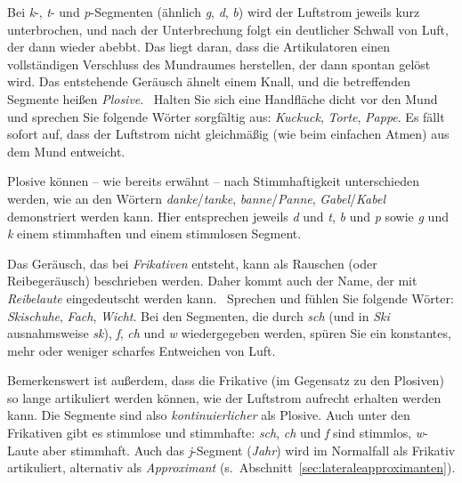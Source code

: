 Bei \textit{k}-, \textit{t}- und \textit{p}-Segmenten (ähnlich \textit{g}, \textit{d}, \textit{b}) wird der Luftstrom jeweils kurz unterbrochen, und nach der Unterbrechung folgt ein deutlicher Schwall von Luft, der dann wieder abebbt.
Das liegt daran, dass die Artikulatoren einen vollständigen Verschluss des Mundraumes herstellen, der dann spontan gelöst wird.
Das entstehende Geräusch ähnelt einem Knall, und die betreffenden Segmente heißen \textit{Plosive}.
\TuBegin~Halten Sie sich eine Handfläche dicht vor den Mund und sprechen Sie folgende Wörter sorgfältig aus: \textit{Kuckuck}, \textit{Torte}, \textit{Pappe}.
Es fällt sofort auf, dass der Luftstrom nicht gleichmäßig (wie beim einfachen Atmen) aus dem Mund entweicht.


Plosive können -- wie bereits erwähnt -- nach Stimmhaftigkeit unterschieden werden, wie an den Wörtern \textit{danke}/\textit{tanke}, \textit{banne}/\textit{Panne}, \textit{Gabel}/\textit{Kabel} demonstriert werden kann.
Hier entsprechen jeweils \textit{d} und \textit{t}, \textit{b} und \textit{p} sowie \textit{g} und \textit{k} einem stimmhaften und einem stimmlosen Segment.

Das Geräusch, das bei \textit{Frikativen} entsteht, kann als Rauschen (oder Reibegeräusch) beschrieben werden.
Daher kommt auch der Name, der mit \textit{Reibelaute} eingedeutscht werden kann.
\TuBegin~Sprechen und fühlen Sie folgende Wörter: \textit{Skischuhe}, \textit{Fach}, \textit{Wicht}.
Bei den Segmenten, die durch \textit{sch} (und in \textit{Ski} ausnahmsweise \textit{sk}), \textit{f}, \textit{ch} und \textit{w} wiedergegeben werden, spüren Sie ein konstantes, mehr oder weniger scharfes Entweichen von Luft.


Bemerkenswert ist außerdem, dass die Frikative (im Gegensatz zu den Plosiven) so lange artikuliert werden können, wie der Luftstrom aufrecht erhalten werden kann.
Die Segmente sind also \textit{kontinuierlicher} als Plosive.
Auch unter den Frikativen gibt es stimmlose und stimmhafte: \textit{sch}, \textit{ch} und \textit{f} sind stimmlos, \textit{w}-Laute aber \zB stimmhaft.
Auch das \textit{j}-Segment (\textit{Jahr}) wird im Normalfall als Frikativ artikuliert, alternativ als \textit{Approximant} (s.\ Abschnitt~\ref{sec:lateraleapproximanten}).


